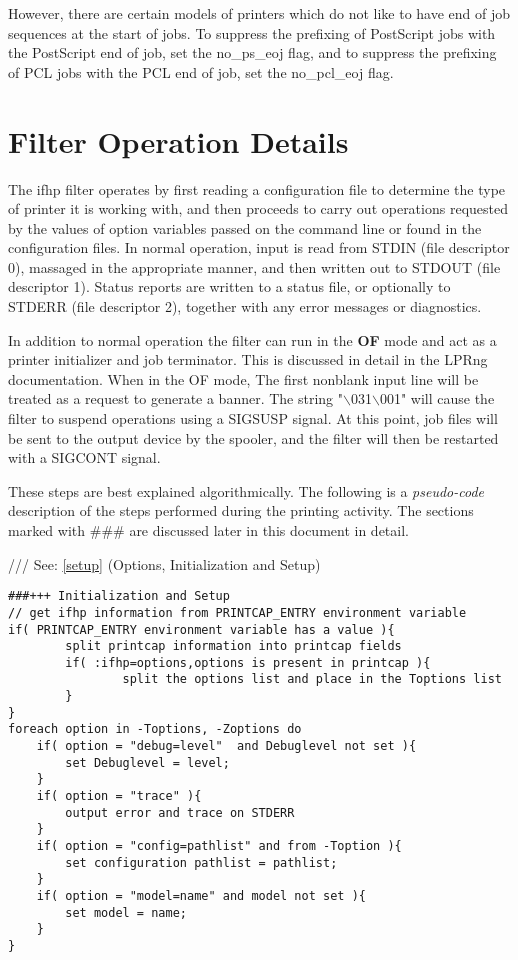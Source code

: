 \documentclass[a4paper]{article}
\begin{document}
However,
there are certain models of printers which do not like to have
end of job sequences at the start of jobs.
To suppress the prefixing of PostScript jobs with the PostScript end of job,
set the
{\ttfamily no\_ps\_eoj}
flag,
and 
to suppress the prefixing of PCL jobs with the PCL end of job,
set the
{\ttfamily no\_pcl\_eoj}
flag.


\section{Filter Operation Details}

\label{read_write}
The
{\ttfamily ifhp}
filter operates by first reading a configuration file
to determine the type of printer it is working with,
and then proceeds to carry out operations requested by the values of
option variables passed on the command line or found in the configuration
files.
In normal operation,
input is read from 
{\ttfamily STDIN}
(file descriptor 0),
massaged in the appropriate manner,
and then written out to
{\ttfamily STDOUT} (file descriptor 1).
Status reports are written to
a status file, or optionally to
{\ttfamily STDERR} (file descriptor 2),
together with any error messages or diagnostics.

In addition to normal operation
the filter can run in the
{\bfseries OF} mode and act as a printer initializer and job terminator.
This is discussed in detail in the LPRng documentation.
When in the OF mode,
The first nonblank input line will be treated as
a request to generate a banner.
The string "$\backslash$031$\backslash$001" will cause the filter to suspend operations
using a SIGSUSP signal.
At this point,
job files will be sent to the output device by the spooler,
and the filter will then be restarted with a SIGCONT signal.

These steps are best explained algorithmically.
The following is a {\itshape pseudo-code\/} description of the steps
performed during the printing activity.
The sections marked with {\ttfamily \#\#\#} are discussed later in this document
in detail.

{\ttfamily ///} See: \ref{setup} {(Options, Initialization and Setup)}
\begin{tscreen}
\begin{verbatim}
###+++ Initialization and Setup
// get ifhp information from PRINTCAP_ENTRY environment variable
if( PRINTCAP_ENTRY environment variable has a value ){
        split printcap information into printcap fields
        if( :ifhp=options,options is present in printcap ){
                split the options list and place in the Toptions list
        }
}
foreach option in -Toptions, -Zoptions do
    if( option = "debug=level"  and Debuglevel not set ){
        set Debuglevel = level;
    }
    if( option = "trace" ){
        output error and trace on STDERR
    }
    if( option = "config=pathlist" and from -Toption ){
        set configuration pathlist = pathlist;
    }
    if( option = "model=name" and model not set ){
        set model = name;
    }
}
\end{verbatim}
\end{tscreen}
\end{document}
